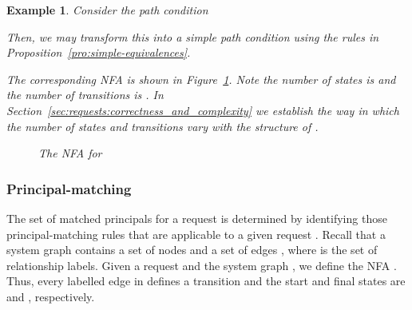 \documentclass{article}
\newtheorem{example}{Example}
\begin{document}
\begin{example}
Consider the path condition

Then, we may transform this into a simple path condition using the rules in Proposition~\ref{pro:simple-equivalences}.

The corresponding NFA is shown in Figure~\ref{fig:example-nfa-for-complexity}.
Note the number of states is  and the number of transitions is .
In Section~\ref{sec:requests:correctness_and_complexity} we establish the way in which the number of states and transitions vary with the structure of .

\begin{figure}[!ht]\centering
    \caption{The NFA for } \label{fig:example-nfa-for-complexity}
\end{figure}
\end{example}

\subsubsection{Principal-matching}

The set of matched principals for a request is determined by identifying those principal-matching rules that are applicable to a given request .
Recall that a system graph  contains a set of nodes  and a set of edges \mbox{}, where  is the set of relationship labels.
Given a request  and the system graph , we define the NFA .
Thus, every labelled edge in  defines a transition and the start and final states are  and , respectively.
\end{document}

